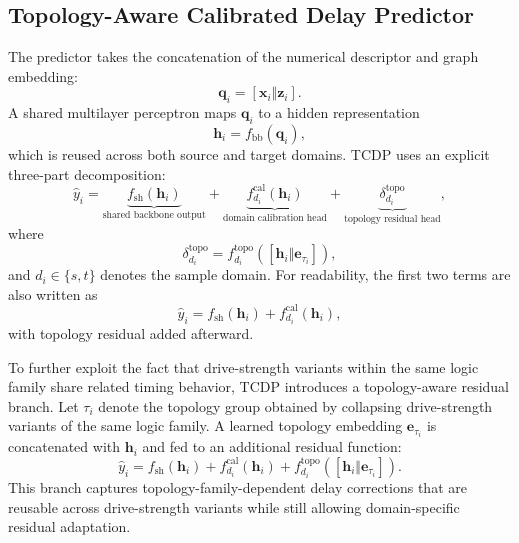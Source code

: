 \documentclass[10pt,a4paper]{article}
\begin{document}
\subsection{Topology-Aware Calibrated Delay Predictor}

The predictor takes the concatenation of the numerical descriptor and graph embedding:
\begin{equation}
    \mathbf{q}_i = \left[\mathbf{x}_i \Vert \mathbf{z}_i\right].
\end{equation}
A shared multilayer perceptron maps $\mathbf{q}_i$ to a hidden representation
\begin{equation}
    \mathbf{h}_i = f_{\mathrm{bb}}(\mathbf{q}_i),
\end{equation}
which is reused across both source and target domains. TCDP uses an explicit three-part decomposition:
\begin{equation}
    \hat{y}_i = \underbrace{f_{\mathrm{sh}}(\mathbf{h}_i)}_{\text{shared backbone output}}
    + \underbrace{f^{\mathrm{cal}}_{d_i}(\mathbf{h}_i)}_{\text{domain calibration head}}
    + \underbrace{\delta^{\mathrm{topo}}_{d_i}}_{\text{topology residual head}},
\end{equation}
where
\begin{equation}
    \delta^{\mathrm{topo}}_{d_i} = f^{\mathrm{topo}}_{d_i}\!\left(\left[\mathbf{h}_i \Vert \mathbf{e}_{\tau_i}\right]\right),
\end{equation}
and $d_i \in \{s,t\}$ denotes the sample domain. For readability, the first two terms are also written as
\begin{equation}
    \hat{y}_i =
    f_{\mathrm{sh}}(\mathbf{h}_i)
    +
    f^{\mathrm{cal}}_{d_i}(\mathbf{h}_i),
\end{equation}
with topology residual added afterward.

To further exploit the fact that drive-strength variants within the same logic family share related timing behavior, TCDP introduces a topology-aware residual branch. Let $\tau_i$ denote the topology group obtained by collapsing drive-strength variants of the same logic family. A learned topology embedding $\mathbf{e}_{\tau_i}$ is concatenated with $\mathbf{h}_i$ and fed to an additional residual function:
\begin{equation}
    \hat{y}_i =
    f_{\mathrm{sh}}(\mathbf{h}_i)
    +
    f^{\mathrm{cal}}_{d_i}(\mathbf{h}_i)
    +
    f^{\mathrm{topo}}_{d_i}
    \left(
        \left[\mathbf{h}_i \Vert \mathbf{e}_{\tau_i}\right]
    \right).
\end{equation}
This branch captures topology-family-dependent delay corrections that are reusable across drive-strength variants while still allowing domain-specific residual adaptation.
\end{document}
